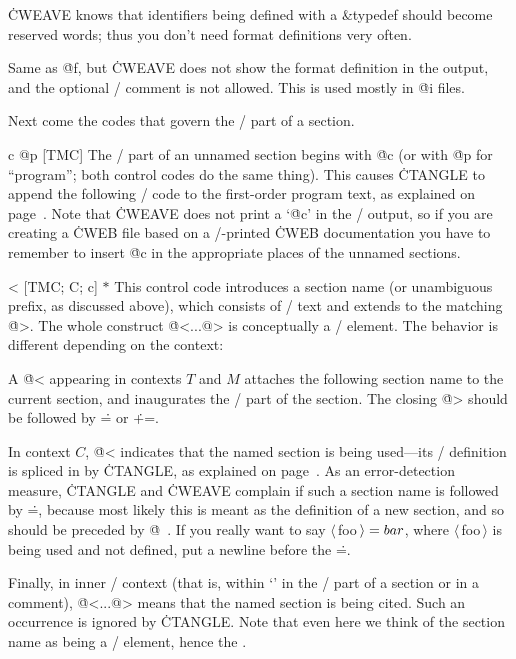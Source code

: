 \more \.{CWEAVE} knows that identifiers being
defined with a \&{typedef} should become reserved words; thus you
don't need format definitions very often.

\@s [TM\to M;\;L] Same as \.{@f}, but \.{CWEAVE} does not show the format
definition in the output, and the optional \CEE/ comment is not
allowed. This is used mostly in \.{@i} files.

\subsec
Next come the codes that govern the \CEE/ part of a section.

\@{c @p} [TM\to C] The \CEE/ part of an unnamed section begins with \.{@c}
(or with \.{@p} for ``program''; both control codes do the same thing).
This causes \.{CTANGLE} to append the following \CEE/ code
to the first-order program text, as explained on page~\tangref.
Note that \.{CWEAVE} does not print a `\.{@c}' in the \TEX/
output, so if you are creating a \.{CWEB} file based on a \TEX/-printed
\.{CWEB} documentation you have to remember to insert \.{@c} in the
appropriate places of the unnamed sections.

\@< [TM\to C;\; C;\; c] $*$ This control code introduces a
section name (or unambiguous prefix, as discussed above), which
consists of \TEX/ text and extends to the matching \.{@>}.
The whole construct \.{@<...@>} is conceptually a \CEE/ element.
The behavior is different depending on the context:

\more A \.{@<} appearing in contexts $T$ and $M$ attaches the
following section name to the current section, and inaugurates the
\CEE/ part of the section.  The closing \.{@>} should be followed by
\.{=} or \.{+=}.

\more
In context $C$, \.{@<} indicates that the named
section is being used---its \CEE/ definition is spliced in by
\.{CTANGLE}, as explained on page~\tangref.
As an error-detection measure,
\.{CTANGLE} and \.{CWEAVE} complain if such a section name is followed
by \.=, because most likely this is meant as the definition of a new
section, and so should be preceded by \.{@\ }.  If you really want to
say $\langle\,$foo$\,\rangle=\\{bar}$, where $\langle\,$foo$\,\rangle$
is being used and not defined, put a newline before the \.=.

\more
Finally, in inner \CEE/ context (that is, within `\pb' in the \TEX/ part
of a section or in a comment), \.{@<...@>}
means that the named section is being
cited.  Such an occurrence is ignored by \.{CTANGLE}. Note that
even here we think of the section name as being a \CEE/ element, hence the \pb.

